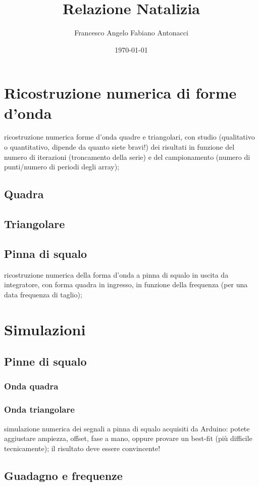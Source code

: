 \documentclass{article}
\author{Francesco Angelo Fabiano Antonacci}
\date{\today}
\title{Relazione Natalizia}
\begin{document}
\maketitle


\section{Ricostruzione numerica di forme d'onda}
ricostruzione numerica forme d'onda quadre e triangolari, 
con studio (qualitativo o quantitativo, dipende da quanto siete bravi!) 
dei risultati in funzione del numero di iterazioni (troncamento della serie)
 e del campionamento (numero di punti/numero di periodi degli array);
\subsection{Quadra}
\subsection{Triangolare}
\subsection{Pinna di squalo}
ricostruzione numerica della forma d'onda a pinna di squalo in uscita da integratore, 
con forma quadra in ingresso, in funzione della frequenza 
(per una data frequenza di taglio);

\section{Simulazioni}
\subsection{Pinne di squalo}
\subsubsection{Onda quadra}
\subsubsection{Onda triangolare}

simulazione numerica dei segnali a pinna di squalo acquisiti da Arduino:
 potete aggiustare ampiezza, offset, fase a mano, oppure provare un best-fit 
 (più difficile tecnicamente); il risultato deve essere convincente!
\subsection{Guadagno e frequenze}
\end{document}
